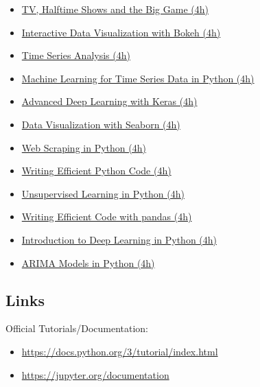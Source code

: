 \documentclass[
  11pt,
]{book}
\providecommand{\tightlist}{%
  \setlength{\itemsep}{0pt}\setlength{\parskip}{0pt}}
\begin{document}
\begin{tipsp}
\begin{itemize}
\tightlist
\item
  \href{https://www.datacamp.com/projects/684}{TV, Halftime Shows and
  the Big Game (4h)}
\item
  \href{https://www.datacamp.com/courses/interactive-data-visualization-with-bokeh}{Interactive
  Data Visualization with Bokeh (4h)}
\item
  \href{https://www.datacamp.com/courses/introduction-to-time-series-analysis-in-python}{Time
  Series Analysis (4h)}
\item
  \href{https://www.datacamp.com/courses/machine-learning-for-time-series-data-in-python}{Machine
  Learning for Time Series Data in Python (4h)}
\item
  \href{https://www.datacamp.com/courses/advanced-deep-learning-with-keras-in-python}{Advanced
  Deep Learning with Keras (4h)}
\item
  \href{https://www.datacamp.com/courses/data-visualization-with-seaborn}{Data
  Visualization with Seaborn (4h)}
\item
  \href{https://www.datacamp.com/courses/web-scraping-with-python}{Web
  Scraping in Python (4h)}
\item
  \href{https://www.datacamp.com/courses/writing-efficient-python-code}{Writing
  Efficient Python Code (4h)}
\item
  \href{https://www.datacamp.com/courses/unsupervised-learning-in-python}{Unsupervised
  Learning in Python (4h)}
\item
  \href{https://www.datacamp.com/courses/optimizing-python-code-with-pandas}{Writing
  Efficient Code with pandas (4h)}
\item
  \href{https://www.datacamp.com/courses/deep-learning-in-python}{Introduction
  to Deep Learning in Python (4h)}
\item
  \href{https://www.datacamp.com/courses/forecasting-using-arima-models-in-python}{ARIMA
  Models in Python (4h)}
\end{itemize}

\end{tipsp}

\hypertarget{links-1}{%
\subsection{Links}\label{links-1}}

Official Tutorials/Documentation:

\begin{itemize}
\tightlist
\item
  \url{https://docs.python.org/3/tutorial/index.html}
\item
  \url{https://jupyter.org/documentation}
\end{itemize}
\end{document}
